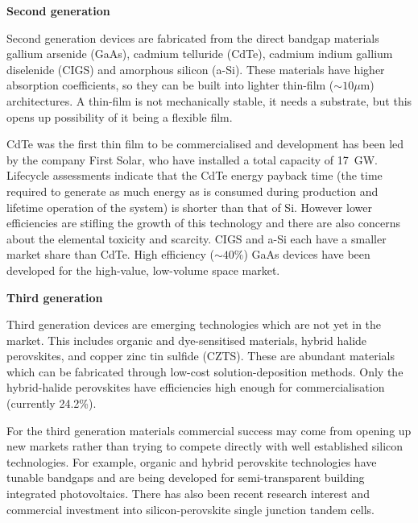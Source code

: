 \textbf{Second generation}

Second generation devices are fabricated from the direct bandgap materials gallium arsenide (GaAs), cadmium telluride (CdTe), cadmium indium gallium diselenide (CIGS) and amorphous silicon (a-Si). These materials have higher absorption coefficients, so they can be built into lighter thin-film ($\sim 10\mu \textrm{m}$) architectures. A thin-film is not mechanically stable, it needs a substrate, but this opens up possibility of it being a flexible film.

CdTe was the first thin film to be commercialised and development has been led by the company First Solar, who have installed a total capacity of \SI{17}{\giga\watt}. Lifecycle assessments indicate that the CdTe energy payback time (the time required to generate as much energy as is consumed during production and lifetime operation of the system) is shorter than that of Si.\autocite{Koppelaar2017} However lower efficiencies are stifling the growth of this technology and there are also concerns about the elemental toxicity and scarcity. CIGS and a-Si each have a smaller market share than CdTe. High efficiency ($\sim 40\%$) GaAs devices have been developed for the high-value, low-volume space market.


\textbf{Third generation}

Third generation devices are emerging technologies which are not yet in the market. This includes organic and dye-sensitised materials, hybrid halide perovskites, and copper zinc tin sulfide (CZTS). These are abundant materials which can be fabricated through low-cost solution-deposition methods. Only the hybrid-halide perovskites have efficiencies high enough for commercialisation (currently 24.2\%).

For the third generation materials commercial success may come from opening up new markets rather than trying to compete directly with well established silicon technologies. For example, organic and hybrid perovskite technologies have tunable bandgaps and are being developed for semi-transparent building integrated photovoltaics.
There has also been recent research interest and commercial investment into silicon-perovskite single junction tandem cells.

